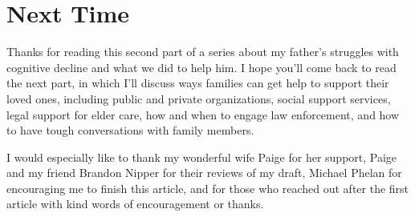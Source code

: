 \documentclass{article}
\begin{document}
\section*{Next Time}

Thanks for reading this second part of a series about my father’s struggles with cognitive decline and what we did to help him. I hope you’ll come back to read the next part, in which I'll discuss ways families can get help to support their loved ones, including public and private organizations, social support services, legal support for elder care, how and when to engage law enforcement, and how to have tough conversations with family members.

I would especially like to thank my wonderful wife Paige for her support, Paige and my friend Brandon Nipper for their reviews of my draft, Michael Phelan for encouraging me to finish this article, and for those who reached out after the first article with kind words of encouragement or thanks. 
\end{document}
